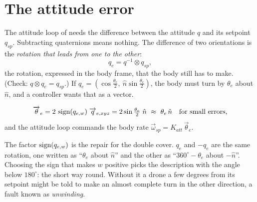 \section{The attitude error}

The attitude loop of  needs the difference between the attitude $q$ and its setpoint $q_{sp}$. Subtracting quaternions means nothing. The difference of two orientations is the \emph{rotation that leads from one to the other}:
\begin{equation}\label{eq:H-qe}
  q_e = q^{-1} \otimes q_{sp} ,
\end{equation}
the rotation, expressed in the body frame, that the body still has to make. (Check: $q \otimes q_e = q_{sp}$.) If $q_e = (\cos\tfrac{\theta_e}{2},\ \hat n\sin\tfrac{\theta_e}{2})$, the body must turn by $\theta_e$ about $\hat n$, and a controller wants that as a vector.

\begin{result}
\begin{equation}\label{eq:H-thetae}
  \overrightarrow{\theta}_e = 2\,\operatorname{sign}(q_{e,w})\;\overrightarrow{q}_{e,xyz} = 2\sin\tfrac{\theta_e}{2}\;\hat n \ \approx\ \theta_e\,\hat n \quad\text{for small errors,}
\end{equation}
and the attitude loop commands the body rate $\vec\omega_{sp} = K_{att}\,\vec\theta_e$.
\end{result}

The factor $\operatorname{sign}(q_{e,w})$ is the repair for the double cover. $q_e$ and $-q_e$ are the same rotation, one written as \enquote{$\theta_e$ about $\hat n$} and the other as \enquote{$360^\circ - \theta_e$ about $-\hat n$}. Choosing the sign that makes $w$ positive picks the description with the angle below $180^\circ$: the short way round. Without it a drone a few degrees from its setpoint might be told to make an almost complete turn in the other direction, a fault known as \emph{unwinding}.

